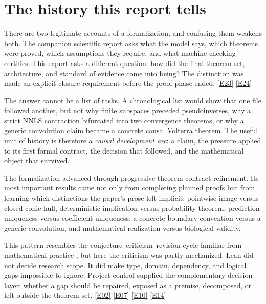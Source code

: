 \documentclass[11pt,a4paper]{article}
\newcommand{\ev}[1]{%
  \hyperref[ev:#1]{\textcolor{ReportBlue}{\textsf{\scriptsize[#1]}}}}
\begin{document}
\begingroup
\small
\setlength{\parskip}{0pt}
\tableofcontents
\endgroup
\clearpage


\section{The history this report tells}
\label{sec:purpose}

There are two legitimate accounts of a formalization, and confusing them weakens
both. The companion scientific report asks what the model says, which theorems were
proved, which assumptions they require, and what machine checking certifies. This
report asks a different question: how did the final theorem set, architecture, and
standard of evidence come into being? The distinction was made an explicit closure
requirement before the proof phase ended. \ev{E23}\ev{E24}

The answer cannot be a list of tasks. A chronological list would show that one file
followed another, but not why finite subspaces preceded pseudoinverses, why a strict
NNLS contraction bifurcated into two convergence theorems, or why a generic
convolution claim became a concrete causal Volterra theorem. The useful unit of
history is therefore a \emph{causal development arc}: a claim, the pressure applied
to its first formal contract, the decision that followed, and the mathematical
object that survived.

\begin{keyresult}
The formalization advanced through progressive theorem-contract refinement. Its
most important results came not only from completing planned proofs but from learning
which distinctions the paper's prose left implicit: pointwise image versus closed
conic hull, deterministic implication versus probability theorem, prediction
uniqueness versus coefficient uniqueness, a concrete boundary convention versus a
generic convolution, and mathematical realization versus biological validity.
\end{keyresult}

This pattern resembles the conjecture--criticism--revision cycle familiar from
mathematical practice \cite{lakatos1976}, but here the criticism was partly mechanized. Lean did not
decide research scope. It did make type, domain, dependency, and logical gaps
impossible to ignore. Project control supplied the complementary decision layer:
whether a gap should be repaired, exposed as a premise, decomposed, or left outside
the theorem set. \ev{E02}\ev{E07}\ev{E10}\ev{E14}
\end{document}
